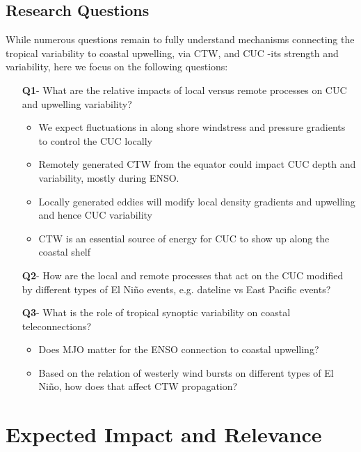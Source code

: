 \subsection{Research Questions}
While numerous questions remain to fully understand mechanisms connecting the tropical variability to coastal upwelling, via CTW, and CUC -its strength and variability, here we focus on the following questions:
\begin{itemize}
    \item [\textbf{Q1}-] What are the relative impacts of local versus remote processes on CUC and upwelling variability?
    \begin{itemize}
        \item We expect fluctuations in along shore windstress and pressure gradients to control the CUC locally
        \item Remotely generated CTW from the equator could impact CUC depth and variability, mostly during ENSO.
        \item Locally generated eddies will modify local density gradients and upwelling and hence CUC variability
        \item CTW is an essential source of energy for CUC to show up  along the coastal shelf 
    \end{itemize}
    \item [\textbf{Q2}-] How are the local and remote processes that act on the CUC modified by different types of El Ni\~no events, e.g. dateline vs East Pacific events?
    \item [\textbf{Q3}-] What is the role of tropical synoptic variability on coastal teleconnections?
    \begin{itemize}
        \item Does MJO matter for the ENSO connection to coastal upwelling?
        \item Based on the relation of westerly wind bursts on different types of El Ni\~no, how does that affect CTW propagation?
    \end{itemize}
\end{itemize}

\section{Expected Impact and Relevance}

